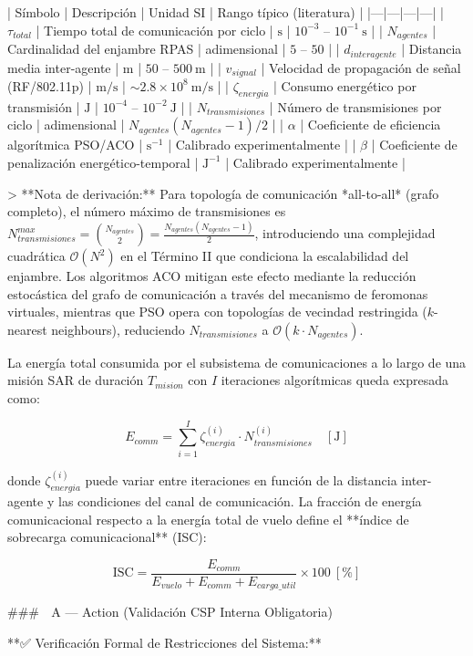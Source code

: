 | Símbolo | Descripción | Unidad SI | Rango típico (literatura) |
|---|---|---|---|
| $\tau_{total}$ | Tiempo total de comunicación por ciclo | $\text{s}$ | $10^{-3} \text{ – } 10^{-1}\ \text{s}$ |
| $N_{agentes}$ | Cardinalidad del enjambre RPAS | adimensional | $5 \text{ – } 50$ |
| $d_{interagente}$ | Distancia media inter-agente | $\text{m}$ | $50 \text{ – } 500\ \text{m}$ |
| $v_{signal}$ | Velocidad de propagación de señal (RF/802.11p) | $\text{m/s}$ | $\sim 2.8 \times 10^8\ \text{m/s}$ |
| $\zeta_{energia}$ | Consumo energético por transmisión | $\text{J}$ | $10^{-4} \text{ – } 10^{-2}\ \text{J}$ |
| $N_{transmisiones}$ | Número de transmisiones por ciclo | adimensional | $N_{agentes}(N_{agentes}-1)/2$ |
| $\alpha$ | Coeficiente de eficiencia algorítmica PSO/ACO | $\text{s}^{-1}$ | Calibrado experimentalmente |
| $\beta$ | Coeficiente de penalización energético-temporal | $\text{J}^{-1}$ | Calibrado experimentalmente |

> **Nota de derivación:** Para topología de comunicación *all-to-all* (grafo completo), el número máximo de transmisiones es $N_{transmisiones}^{max} = \binom{N_{agentes}}{2} = \frac{N_{agentes}(N_{agentes}-1)}{2}$, introduciendo una complejidad cuadrática $\mathcal{O}(N^2)$ en el Término II que condiciona la escalabilidad del enjambre. Los algoritmos ACO mitigan este efecto mediante la reducción estocástica del grafo de comunicación a través del mecanismo de feromonas virtuales, mientras que PSO opera con topologías de vecindad restringida ($k$-nearest neighbours), reduciendo $N_{transmisiones}$ a $\mathcal{O}(k \cdot N_{agentes})$.

La energía total consumida por el subsistema de comunicaciones a lo largo de una misión SAR de duración $T_{mision}$ con $I$ iteraciones algorítmicas queda expresada como:

$$
E_{comm} = \sum_{i=1}^{I} \zeta_{energia}^{(i)} \cdot N_{transmisiones}^{(i)} \quad [\text{J}]
$$

donde $\zeta_{energia}^{(i)}$ puede variar entre iteraciones en función de la distancia inter-agente y las condiciones del canal de comunicación. La fracción de energía comunicacional respecto a la energía total de vuelo define el **índice de sobrecarga comunicacional** (ISC):

$$
\text{ISC} = \frac{E_{comm}}{E_{vuelo} + E_{comm} + E_{carga\_util}} \times 100\ [\%]
$$

### 🔷 A — Action (Validación CSP Interna Obligatoria)

**✅ Verificación Formal de Restricciones del Sistema:**

